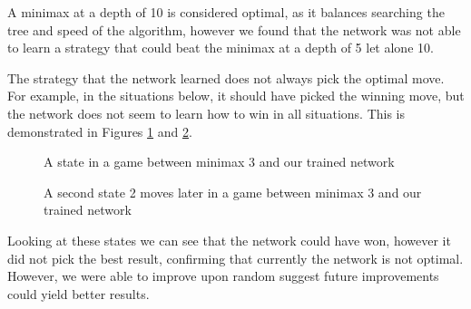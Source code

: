 A minimax at a depth of 10 is considered optimal, as it balances searching the tree and speed of the algorithm, however we found that the network was not able to learn a strategy that could beat the minimax at a depth of 5 let alone 10.

The strategy that the network learned does not always pick the optimal move. For example, in the situations below, it should have picked the winning move, but the network does not seem to learn how to win in all situations. This is demonstrated in Figures \ref{state_move_0} and  \ref{state_move_2}.

\begin{figure}
    \caption{A state in a game between minimax 3 and our trained network}
    \label{state_move_0}
\end{figure}


\begin{figure}
    \caption{A second state 2 moves later in a game between minimax 3 and our trained network}
    \label{state_move_2}
\end{figure}


Looking at these states we can see that the network could have won, however it did not pick the best result, confirming that currently the network is not optimal. However, we were able to improve upon random suggest future improvements could yield better results. 